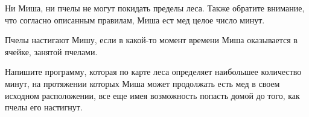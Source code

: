 Ни Миша, ни пчелы не могут покидать пределы леса. Также обратите внимание, что согласно описанным правилам, Миша ест мед целое число минут.

Пчелы настигают Мишу, если в какой-то момент времени Миша оказывается в ячейке, занятой
пчелами.

Напишите программу, которая по карте леса определяет наибольшее количество минут, на
протяжении которых Миша может продолжать есть мед в своем исходном расположении, все еще имея возможность попасть домой до того, как пчелы его настигнут.
